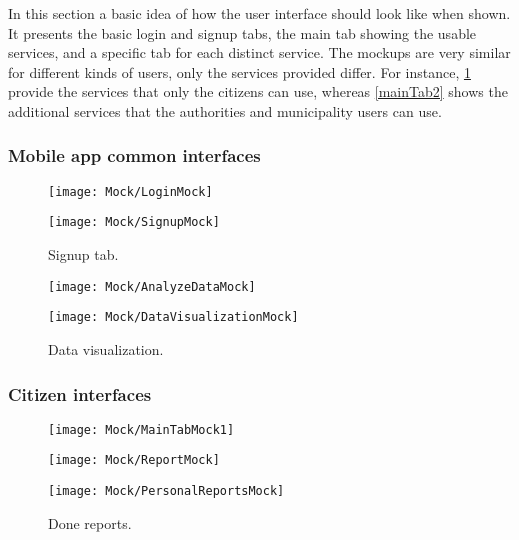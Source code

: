 In this section a basic idea of how the user interface should look like when shown. It presents the basic login and signup tabs, the main tab showing the usable services, and a specific tab for each distinct service. The mockups are very similar for different kinds of users, only the services provided differ. For instance, \ref{mainTab1} provide the services that only the citizens can use, whereas \ref{mainTab2} shows the additional services that the authorities and municipality users can use.

\subsubsection{Mobile app common interfaces}

\begin{figure}[H]
	\centering
	\begin{minipage}[b]{0.38\linewidth}
		\texttt{[image: Mock/LoginMock]}
	    \caption{Login tab.}
	\end{minipage}
	\begin{minipage}[b]{0.38\linewidth}
	    \texttt{[image: Mock/SignupMock]}
	    \caption{Signup tab.}
	\end{minipage}
\end{figure}

\begin{figure}[H]
	\centering
		\begin{minipage}[b]{0.38\linewidth}
		\texttt{[image: Mock/AnalyzeDataMock]}
		\caption{Analyze data.}
	\end{minipage}
	\begin{minipage}[b]{0.38\linewidth}
		\texttt{[image: Mock/DataVisualizationMock]}
		\caption{Data visualization.}
	\end{minipage}
\end{figure}

\subsubsection{Citizen interfaces}

\begin{figure}[H]
	\centering
		\begin{minipage}[b]{0.328\linewidth}
		\texttt{[image: Mock/MainTabMock1]}
		\caption{Main tab 1.}
		\label{mainTab1}
	\end{minipage}
	\begin{minipage}[b]{0.328\linewidth}
		\texttt{[image: Mock/ReportMock]}
		\caption{Report tab.}
	\end{minipage}
	\begin{minipage}[b]{0.328\linewidth}
		\texttt{[image: Mock/PersonalReportsMock]}
		\caption{Done reports.}
	\end{minipage}	
\end{figure}

